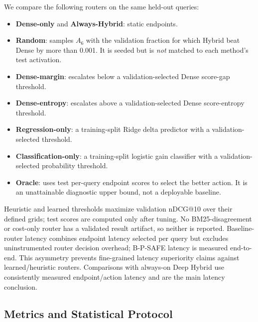 \documentclass[10pt,journal]{IEEEtran}
\makeatletter
\newcommand{\bpsafe}{B-P-SAFE}
\newcommand{\deephybrid}{Deep Hybrid}
\newcommand{\ndcg}{nDCG@10}
\makeatother
\begin{document}
We compare the following routers on the same held-out queries:
\begin{itemize}
    \item \textbf{Dense-only} and \textbf{Always-Hybrid}: static endpoints.
    \item \textbf{Random}: samples $A_6$ with the validation fraction for which Hybrid beat Dense by more than 0.001. It is seeded but is \emph{not} matched to each method's test activation.
    \item \textbf{Dense-margin}: escalates below a validation-selected Dense score-gap threshold.
    \item \textbf{Dense-entropy}: escalates above a validation-selected Dense score-entropy threshold.
    \item \textbf{Regression-only}: a training-split Ridge delta predictor with a validation-selected threshold.
    \item \textbf{Classification-only}: a training-split logistic gain classifier with a validation-selected probability threshold.
    \item \textbf{Oracle}: uses test per-query endpoint scores to select the better action. It is an unattainable diagnostic upper bound, not a deployable baseline.
\end{itemize}
Heuristic and learned thresholds maximize validation \ndcg{} over their defined grids; test scores are computed only after tuning. No BM25-disagreement or cost-only router has a validated result artifact, so neither is reported. Baseline-router latency combines endpoint latency selected per query but excludes uninstrumented router decision overhead; \bpsafe{} latency is measured end-to-end. This asymmetry prevents fine-grained latency superiority claims against learned/heuristic routers. Comparisons with always-on \deephybrid{} use consistently measured endpoint/action latency and are the main latency conclusion.

\subsection{Metrics and Statistical Protocol}
\end{document}
